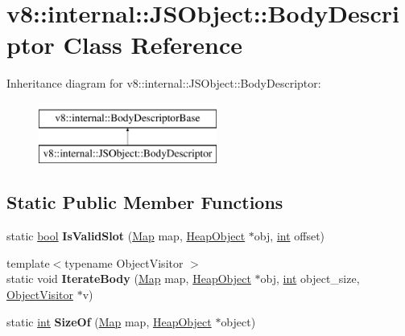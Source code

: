 \hypertarget{classv8_1_1internal_1_1JSObject_1_1BodyDescriptor}{}\section{v8\+:\+:internal\+:\+:J\+S\+Object\+:\+:Body\+Descriptor Class Reference}
\label{classv8_1_1internal_1_1JSObject_1_1BodyDescriptor}
Inheritance diagram for v8\+:\+:internal\+:\+:J\+S\+Object\+:\+:Body\+Descriptor\+:\begin{figure}[H]
\begin{center}
\leavevmode
\includegraphics[height=2.000000cm]{classv8_1_1internal_1_1JSObject_1_1BodyDescriptor}
\end{center}
\end{figure}
\subsection*{Static Public Member Functions}
\begin{DoxyCompactItemize}
\item 
\mbox{\label{classv8_1_1internal_1_1JSObject_1_1BodyDescriptor_af4f057317ad18253bedd9b163ccc73fa}} 
static \mbox{\hyperlink{classbool}{bool}} {\bfseries Is\+Valid\+Slot} (\mbox{\hyperlink{classv8_1_1internal_1_1Map}{Map}} map, \mbox{\hyperlink{classv8_1_1internal_1_1HeapObject}{Heap\+Object}} $\ast$obj, \mbox{\hyperlink{classint}{int}} offset)
\item 
\mbox{\label{classv8_1_1internal_1_1JSObject_1_1BodyDescriptor_a2b955c9b9e42592f5352f41849d18760}} 
{\footnotesize template$<$typename Object\+Visitor $>$ }\\static void {\bfseries Iterate\+Body} (\mbox{\hyperlink{classv8_1_1internal_1_1Map}{Map}} map, \mbox{\hyperlink{classv8_1_1internal_1_1HeapObject}{Heap\+Object}} $\ast$obj, \mbox{\hyperlink{classint}{int}} object\+\_\+size, \mbox{\hyperlink{classv8_1_1internal_1_1ObjectVisitor}{Object\+Visitor}} $\ast$v)
\item 
\mbox{\label{classv8_1_1internal_1_1JSObject_1_1BodyDescriptor_a666c718930177dbe98548b402d5a7d74}} 
static \mbox{\hyperlink{classint}{int}} {\bfseries Size\+Of} (\mbox{\hyperlink{classv8_1_1internal_1_1Map}{Map}} map, \mbox{\hyperlink{classv8_1_1internal_1_1HeapObject}{Heap\+Object}} $\ast$object)
\end{DoxyCompactItemize}
